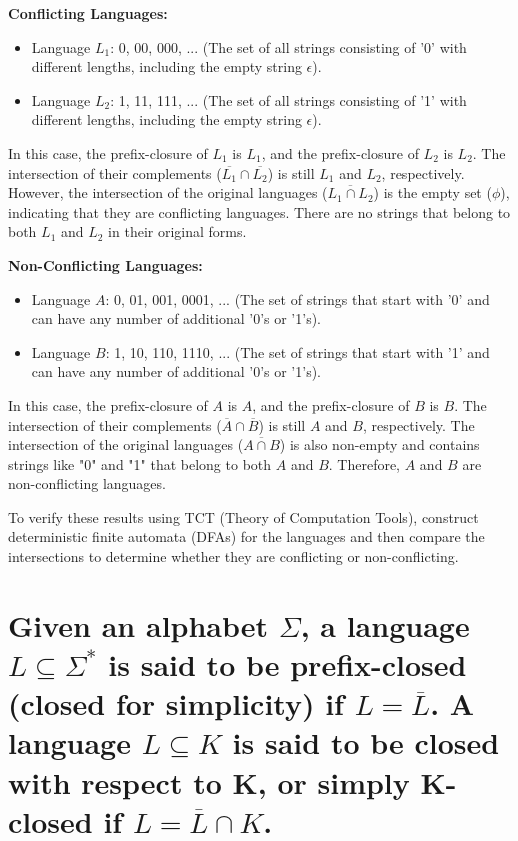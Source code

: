 \documentclass{article}
\begin{document}
\textbf{Conflicting Languages:}

\begin{itemize}
  \item Language $L_1$: {0, 00, 000, ...} (The set of all strings consisting of '0' with different lengths, including the empty string $\epsilon$).
  \item Language $L_2$: {1, 11, 111, ...} (The set of all strings consisting of '1' with different lengths, including the empty string $\epsilon$).
\end{itemize}

In this case, the prefix-closure of $L_1$ is $L_1$, and the prefix-closure of $L_2$ is $L_2$. The intersection of their complements ($\overline{L_1} \cap \overline{L_2}$) is still $L_1$ and $L_2$, respectively. However, the intersection of the original languages ($\overline{L_1 \cap L_2}$) is the empty set ($\phi $), indicating that they are conflicting languages. There are no strings that belong to both $L_1$ and $L_2$ in their original forms.

\textbf{Non-Conflicting Languages:}

\begin{itemize}
  \item Language $A$: {0, 01, 001, 0001, ...} (The set of strings that start with '0' and can have any number of additional '0's or '1's).
  \item Language $B$: {1, 10, 110, 1110, ...} (The set of strings that start with '1' and can have any number of additional '0's or '1's).
\end{itemize}

In this case, the prefix-closure of $A$ is $A$, and the prefix-closure of $B$ is $B$. The intersection of their complements ($\overline{A} \cap \overline{B}$) is still $A$ and $B$, respectively. The intersection of the original languages ($\overline{A \cap B}$) is also non-empty and contains strings like "0" and "1" that belong to both $A$ and $B$. Therefore, $A$ and $B$ are non-conflicting languages.

To verify these results using TCT (Theory of Computation Tools), construct deterministic finite automata (DFAs) for the languages and then compare the intersections to determine whether they are conflicting or non-conflicting.

\section{Given an alphabet $\Sigma$, a language $L \subseteq  \Sigma^*$ is said to be prefix-closed (closed for simplicity) if $L = \overline{L}$. A language $L \subseteq  K$ is said to be closed with respect to K, or simply K-closed if $L = \overline{L} \cap K$.}
\end{document}
